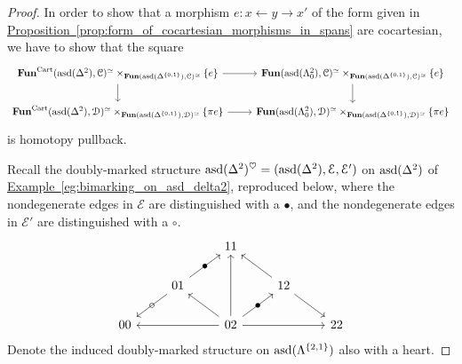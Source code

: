 \documentclass[main.tex]{subfiles}
\begin{document}
\begin{proof}
  In order to show that a morphism $e\colon x \leftarrow y \rightarrow x'$ of the form given in \hyperref[prop:form_of_cocartesian_morphisms_in_spans]{Proposition~\ref*{prop:form_of_cocartesian_morphisms_in_spans}} are cocartesian, we have to show that
  the square
  \begin{equation*}
    \begin{tikzcd}
      \Fun^{\Cart}(\asd(\Delta^{2}), \category{C})^{\simeq} \times_{\Fun(\asd(\Delta^{\{0, 1\}}), \category{C})^{\simeq}} \{e\}
      \arrow[r]
      \arrow[d]
      & \Fun(\asd(\Lambda^{2}_{0}), \category{C})^{\simeq} \times_{\Fun(\asd(\Delta^{\{0, 1\}}), \category{C})^{\simeq}} \{e\}
      \arrow[d]
      \\
      \Fun^{\Cart}(\asd(\Delta^{2}), \category{D})^{\simeq} \times_{\Fun(\asd(\Delta^{\{0, 1\}}), \category{D})^{\simeq}} \{\pi e\}
      \arrow[r]
      & \Fun(\asd(\Lambda^{2}_{0}), \category{D})^{\simeq} \times_{\Fun(\asd(\Delta^{\{0, 1\}}), \category{D})^{\simeq}} \{\pi e\}
    \end{tikzcd}
  \end{equation*}
  is homotopy pullback.

  Recall the doubly-marked structure $\mathrm{asd}(\Delta^{2})^{\heartsuit} = (\mathrm{asd}(\Delta^{2}), \mathcal{E}, \mathcal{E}')$ on $\mathrm{asd}(\Delta^{2})$ of \hyperref[eg:bimarking_on_asd_delta2]{Example~\ref*{eg:bimarking_on_asd_delta2}}, reproduced below, where the nondegenerate edges in $\mathcal{E}$ are distinguished with a $\bullet$, and the nondegenerate edges in $\mathcal{E}'$ are distinguished with a $\circ$.
  \begin{equation*}
    \begin{tikzcd}
      && 11
      \\
      & 01
      \arrow[ur, "\bullet" marking]
      \arrow[dl, "\circ" marking]
      && 12
      \arrow[ul]
      \arrow[dr]
      \\
      00
      && 02
      \arrow[ll]
      \arrow[rr]
      \arrow[uu]
      \arrow[ur, "\bullet" marking]
      \arrow[ul]
      && 22
    \end{tikzcd}
  \end{equation*}
  Denote the induced doubly-marked structure on $\mathrm{asd}(\Lambda^{\{2, 1\}})$ also with a heart.


\end{proof}
\end{document}
